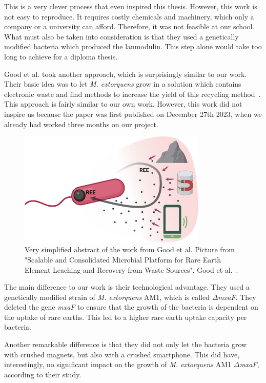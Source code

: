 This is a very clever process that even inspired this thesis.
However, this work is not easy to reproduce.
It requires costly chemicals and machinery, which only a company or a university can afford.
Therefore, it was not feasible at our school.
What must also be taken into consideration is that they used a genetically modified bacteria which produced the lanmodulin.
This step alone would take too long to achieve for a diploma thesis.

\newpage

Good et al. took another approach, which is surprisingly similar to our work.
Their basic idea was to let \emph{M. extorquens} grow in a solution which contains electronic waste and find methods to increase the yield of this recycling method~\cite{similarwork}.
This approach is fairly similar to our own work.
However, this work did not inspire us because the paper was first published on December 27th 2023, when we already had worked three months on our project.

\begin{figure}[H]
    \centering
    \includegraphics[width=0.8\textwidth]{./media/images/similar_work}
    \caption{Very simplified abstract of the work from Good et al.
    Picture from "Scalable and Consolidated Microbial Platform for Rare Earth Element Leaching and Recovery from Waste Sources", Good et al.~\cite{similarwork}.}
    \label{fig:similar_work}
\end{figure}

The main difference to our work is their technological advantage.
They used a genetically modified strain of \emph{M. extorquens} AM1, which is called \(\Delta\)\emph{mxaF}.
They deleted the gene \emph{mxaF} to ensure that the growth of the bacteria is dependent on the uptake of rare earths.
This led to a higher rare earth uptake capacity per bacteria.

Another remarkable difference is that they did not only let the bacteria grow with crushed magnets, but also with a crushed smartphone.
This did have, interestingly, no significant impact on the growth of \emph{M. extorquens} AM1 \(\Delta\)\emph{mxaF}, according to their study.

